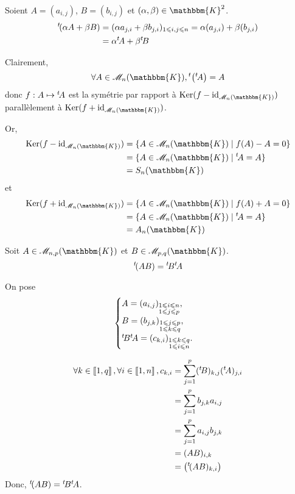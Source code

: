 \begin{prv}
	Soient $A = (a_{i,j})$, $B = (b_{i,j})$ et $(\alpha, \beta) \in \mathbbm{K}^2$.
	\begin{align*}
		{}^t\! (\alpha A + \beta B) &= (\alpha a_{j,i} + \beta b_{j,i})_{1 \leqslant i,j \leqslant n} = \alpha (a_{j,i}) + \beta (b_{j,i}) \\
		&= \alpha {}^t\! A + \beta {}^t\! B \\
	\end{align*}
	
	Clairement, \[
		\forall A \in \mathcal{M}_n(\mathbbm{K}), \t\left( \t A \right) = A
	\] donc $f: A \mapsto {}^t\! A$ est la symétrie par rapport à $\Ker(f - \id_{\mathcal{M}_n(\mathbbm{K})})$ parallèlement à $\Ker(f + \id_{\mathcal{M}_n(\mathbbm{K})})$.

	Or, \begin{align*}
		\Ker(f - \id_{\mathcal{M}_n(\mathbbm{K})}) &= \{A \in \mathcal{M}_n(\mathbbm{K})  \mid  f(A) - A = 0\}  \\
		&= \{A \in \mathcal{M}_n(\mathbbm{K})  \mid  \t A = A\} \\
		&= S_n(\mathbbm{K}) \\
	\end{align*} et
	\begin{align*}
		\Ker(f + \id_{\mathcal{M}_n(\mathbbm{K})}) &= \{A \in \mathcal{M}_n(\mathbbm{K})  \mid f(A) + A = 0\}\\
		&= \{A \in \mathcal{M}_n(\mathbbm{K})  \mid \t A = A\} \\
		&= A_n(\mathbbm{K}) \\
	\end{align*}
\end{prv}

\begin{prop}
	Soit $A \in \mathcal{M}_{n,p}(\mathbbm{K})$ et $B \in \mathcal{M}_{p,q}(\mathbbm{K})$. \[
		{}^t\! (AB) = {}^t\! B {}^t\! A
	\]
\end{prop}

\begin{prv}
	On pose \[
		\begin{cases}
			A = (a_{i,j})_{\substack{1\leqslant i\leqslant n\\1\leqslant j\leqslant p}},\\
			B = (b_{j,k})_{\substack{1\leqslant j\leqslant p\\1\leqslant k\leqslant q}},\\
			{}^t\! B {}^t\! A = (c_{k,i})_{\substack{1\leqslant k\leqslant q\\1\leqslant i\leqslant n}}.
		\end{cases}
	\]

	\begin{align*}
		\forall k \in \left\llbracket 1,q \right\rrbracket, \forall i \in \left\llbracket 1,n \right\rrbracket, 
		c_{k,i} &= \sum_{j=1}^p ({}^t\! B)_{k,j} ({}^t\! A)_{j,i}\\
		&= \sum_{j=1}^p b_{j,k} a_{i,j} \\
		&= \sum_{j=1}^p a_{i,j} b_{j,k} \\
		&= (AB)_{i,k} \\
		&= \left( {}^t\!(AB)_{k,i} \right) \\
	\end{align*}
	Donc, ${}^t\!(AB) = {}^t\! B {}^t\! A$.
\end{prv}

